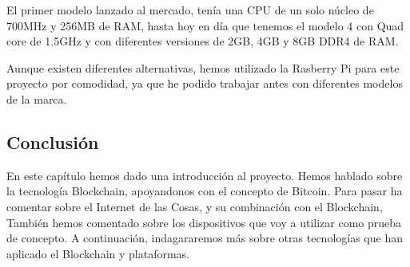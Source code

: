 \vspace{5mm}

\noindent El primer modelo lanzado al mercado, tenía una CPU de un solo núcleo de 700MHz y 256MB de RAM, hasta hoy en 
día que tenemos el modelo 4 con Quad core de 1.5GHz y con diferentes versiones de 2GB, 4GB y 8GB DDR4 de RAM.

\vspace{5mm}

\noindent Aunque existen diferentes alternativas, hemos utilizado la Rasberry Pi para este proyecto por comodidad, ya 
que he podido trabajar antes con diferentes modelos de la marca.

\subsection{Conclusión}

En este capítulo hemos dado una introducción al proyecto. Hemos hablado sobre la tecnología Blockchain, apoyandonos 
con el concepto de Bitcoin. Para pasar ha comentar sobre el Internet de las Cosas, y su combinación con el Blockchain, 
También hemos comentado sobre los dispositivos que voy a utilizar como prueba de concepto. A continuación, indagararemos 
más sobre otras tecnologías que han aplicado el Blockchain y plataformas.

\newpage